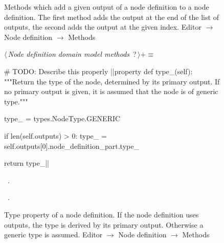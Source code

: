 \documentclass[%
    a4paper,    %
    justified,  %
    nobib,      %
    openany     %
]{tufte-book}
\makeatletter
\renewcommand{\label}[1]{\@tufte@label{##1}}%
\makeatother
\begin{document}
\begin{figure}
\begin{flushleft}
\begin{minipage}{\linewidth}
\begin{list}{}{\setlength{\itemsep}{-\parsep}\setlength{\itemindent}{-\leftmargin}}
\item{}
\end{list}
\end{minipage}\vspace{4ex}
\end{flushleft}
\caption{Methods which add a given output of a node definition to a node
  definition. The first method adds the output at the end of the list of
  outputs, the second adds the output at the given index.
  \newline{}\newline{}Editor $\rightarrow$ Node definition $\rightarrow$
  Methods}
\label{editor:lst:node-definition:methods:add-output}
\end{figure}

\begin{figure}
\begin{flushleft} \small
\begin{minipage}{\linewidth}\label{scrap144}\raggedright\small
{} $\langle\,${\itshape Node definition domain model methods}\nobreak\ {\footnotesize {?}}$\,\rangle+\equiv$
\vspace{-1ex}
\begin{pythoncode}
# TODO: Describe this properly
|\normalfont{}\fontfamily{}|property
def type_(self):
    """Return the type of the node, determined by its primary output.
    If no primary output is given, it is assumed that the node is of
    generic type."""

    type_ = types.NodeType.GENERIC

    if len(self.outputs) > 0:
        type_ = self.outputs[0].node_definition_part.type_

    return type_|\NWsep|
\end{pythoncode}
\vspace{1.5ex}
\footnotesize
\begin{list}{}{\setlength{\itemsep}{-\parsep}\setlength{\itemindent}{-\leftmargin}}
\item \NWtxtMacroDefBy\ .
\item \NWtxtMacroRefIn\ .

\item{}
\end{list}
\end{minipage}\vspace{4ex}
\end{flushleft}
\caption{Type property of a node definition. If the node definition uses
  outputs, the type is derived by its primary output. Otherwise a generic type
  is assumed.
  \newline{}\newline{}Editor $\rightarrow$ Node definition $\rightarrow$
  Methods}
\label{editor:lst:node-definition:methods:type}
\end{figure}
\end{document}
